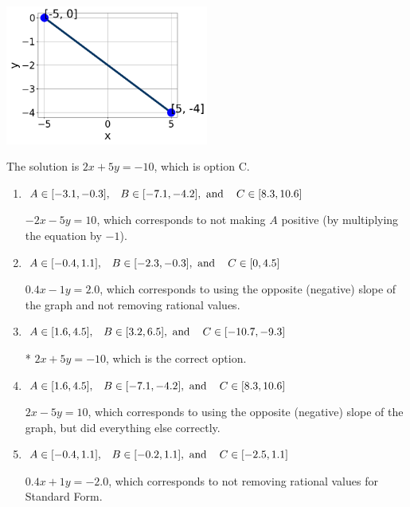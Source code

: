 \documentclass{extbook}[14pt]
\begin{document}
\begin{enumerate}
{\begin{center}
    \includegraphics[width=0.5\textwidth]{../Figures/linearGraphToStandardCopyA.png}
\end{center}


The solution is \( 2x + 5y = -10 \), which is option C.\begin{enumerate}[label=\Alph*.]
\item \( A \in [-3.1, -0.3], \hspace{3mm} B \in [-7.1, -4.2], \text{ and } \hspace{3mm} C \in [8.3, 10.6] \)

 $-2x - 5y = 10$, which corresponds to not making $A$ positive (by multiplying the equation by $-1$).
\item \( A \in [-0.4, 1.1], \hspace{3mm} B \in [-2.3, -0.3], \text{ and } \hspace{3mm} C \in [0, 4.5] \)

 $0.4x - 1y = 2.0$, which corresponds to using the opposite (negative) slope of the graph and not removing rational values.
\item \( A \in [1.6, 4.5], \hspace{3mm} B \in [3.2, 6.5], \text{ and } \hspace{3mm} C \in [-10.7, -9.3] \)

* $2x + 5y = -10$, which is the correct option.
\item \( A \in [1.6, 4.5], \hspace{3mm} B \in [-7.1, -4.2], \text{ and } \hspace{3mm} C \in [8.3, 10.6] \)

 $2x - 5y = 10$, which corresponds to using the opposite (negative) slope of the graph, but did everything else correctly.
\item \( A \in [-0.4, 1.1], \hspace{3mm} B \in [-0.2, 1.1], \text{ and } \hspace{3mm} C \in [-2.5, 1.1] \)

 $0.4x + 1y = -2.0$, which corresponds to not removing rational values for Standard Form.
\end{enumerate}

}
\end{enumerate}
\end{document}
